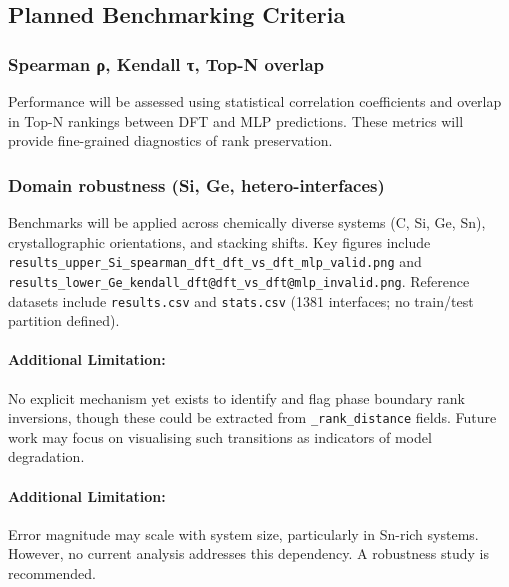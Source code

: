 
\subsection{Planned Benchmarking Criteria}

\subsubsection{Spearman ρ, Kendall τ, Top-N overlap}
Performance will be assessed using statistical correlation coefficients and overlap in Top-N rankings between DFT and
MLP predictions. These metrics will provide fine-grained diagnostics of rank preservation.


\subsubsection{Domain robustness (Si, Ge, hetero-interfaces)}
Benchmarks will be applied across chemically diverse systems (C, Si, Ge, Sn), crystallographic orientations, and
stacking shifts. Key figures include \texttt{results\_upper\_Si\_spearman\_dft\_dft\_vs\_dft\_mlp\_valid.png} and
\texttt{results\_lower\_Ge\_kendall\_dft@dft\_vs\_dft@mlp\_invalid.png}. Reference datasets include
\texttt{results.csv} and \texttt{stats.csv} (1381 interfaces; no train/test partition defined).

\paragraph{Additional Limitation:}
No explicit mechanism yet exists to identify and flag phase boundary rank inversions, though these could be extracted
from \texttt{\_rank\_distance} fields. Future work may focus on visualising such transitions as indicators of model
degradation.


\paragraph{Additional Limitation:}
Error magnitude may scale with system size, particularly in Sn-rich systems. However, no current analysis addresses
this dependency. A robustness study is recommended.

